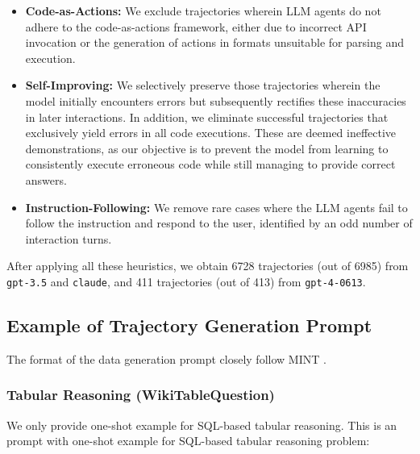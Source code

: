 \begin{itemize}
    \item \textbf{Code-as-Actions:} 
    We exclude trajectories wherein LLM agents do not adhere to the code-as-actions framework, either due to incorrect API invocation or the generation of actions in formats unsuitable for parsing and execution.

    \item \textbf{Self-Improving:} We selectively preserve those trajectories wherein the model initially encounters errors but subsequently rectifies these inaccuracies in later interactions. In addition, we eliminate successful trajectories that exclusively yield errors in all code executions. These are deemed ineffective demonstrations, as our objective is to prevent the model from learning to consistently execute erroneous code while still managing to provide correct answers.
    
    \item \textbf{Instruction-Following: }We remove rare cases where the LLM agents fail to follow the instruction and respond to the user, identified by an odd number of interaction turns.

\end{itemize}

After applying all these heuristics, we obtain 6728 trajectories (out of 6985) from \texttt{gpt-3.5} and \texttt{claude}, and 411 trajectories (out of 413) from \texttt{gpt-4-0613}.

\subsection{Example of Trajectory Generation Prompt}
\label{sec:interaction_data_gen_prompt}

The format of the data generation prompt closely follow MINT \citep{wang2023mint}.

\subsubsection{Tabular Reasoning (WikiTableQuestion)}
\label{sec:interaction_data_gen_prompt_tabular}
We only provide one-shot example for SQL-based tabular reasoning. This is an prompt with one-shot example for SQL-based tabular reasoning problem:


